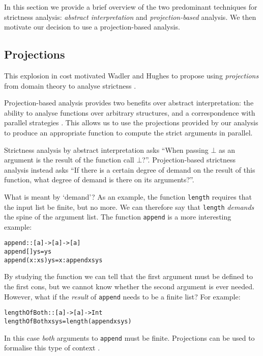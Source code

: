In this section we provide a brief overview of the two
predominant techniques for strictness analysis: \emph{abstract interpretation}
and \emph{projection-based} analysis.  We then motivate our decision to use a
projection-based analysis.

\subsection{Projections}

This explosion in cost motivated Wadler and Hughes to propose using
\emph{projections} from domain theory to analyse strictness
\citep{wadler1987projections}.


Projection-based analysis provides two benefits over abstract interpretation:
the ability to analyse functions over arbitrary structures, and a
correspondence with parallel strategies \citep{marlow2010seq, strategies}. This
allows us to use the projections provided by our analysis to produce an
appropriate function to compute the strict arguments in parallel.

Strictness analysis by abstract interpretation asks ``When passing $\bot$ as an
argument is the result of the function call $\bot$?''. Projection-based
strictness analysis instead asks ``If there is a certain degree of demand on
the result of this function, what degree of demand is there on its
arguments?''.

What is meant by `demand'? As an example, the function \verb'length' requires
that the input list be finite, but no more. We can therefore say that
\verb'length' \emph{demands} the spine of the argument list. The function
\verb'append' is a more interesting example:

\begin{alltt}
        append :: [a] -> [a] -> [a]
        append []     ys = ys
        append (x:xs) ys = x : append xs ys
\end{alltt}

By studying the function we can tell that the first argument must be defined to
the first cons, but we cannot know whether the second argument is ever needed. However, what
if the \emph{result} of \verb'append' needs to be a finite list? For example:

\begin{alltt}

    lengthOfBoth :: [a] -> [a] -> Int
    lengthOfBoth xs ys = length (append xs ys)
\end{alltt}

In this case \emph{both} arguments to \verb'append' must be finite. Projections
can be used to formalise this type of context \citep{wadler1987projections,
hinze1995projection}.

